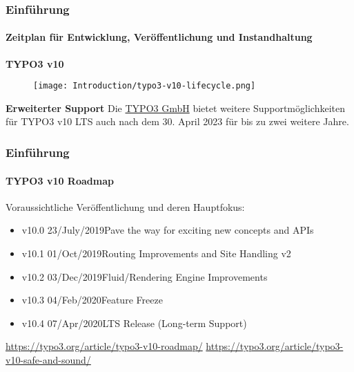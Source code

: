 
\begin{frame}[fragile]
	\frametitle{Einführung}
	\framesubtitle{Zeitplan für Entwicklung, Veröffentlichung und Instandhaltung}

	\textbf{TYPO3 v10}

	\begin{figure}
		\texttt{[image: Introduction/typo3-v10-lifecycle.png]}
	\end{figure}

	\textbf{Erweiterter Support}\newline
	\smaller
		Die \href{https://typo3.com}{TYPO3 GmbH} bietet weitere Supportmöglichkeiten
		für TYPO3 v10 LTS auch nach dem 30. April 2023 für bis zu zwei weitere Jahre.
	\normalsize

\end{frame}


\begin{frame}[fragile]
	\frametitle{Einführung}
	\framesubtitle{TYPO3 v10 Roadmap}

	Voraussichtliche Veröffentlichung und deren Hauptfokus:

	\begin{itemize}

		\item v10.0 \tabto{1.1cm}23/July/2019\tabto{3.4cm}Pave the way for exciting new concepts and APIs
		\item v10.1 \tabto{1.1cm}01/Oct/2019\tabto{3.4cm}Routing Improvements and Site Handling v2
		\item
			\begingroup
				\color{typo3orange}
				v10.2 \tabto{1.1cm}03/Dec/2019\tabto{3.4cm}Fluid/Rendering Engine Improvements
			\endgroup
		\item v10.3 \tabto{1.1cm}04/Feb/2020\tabto{3.4cm}Feature Freeze
		\item v10.4 \tabto{1.1cm}07/Apr/2020\tabto{3.4cm}LTS Release (Long-term Support)

	\end{itemize}

	\smaller
		\url{https://typo3.org/article/typo3-v10-roadmap/}\newline
		\url{https://typo3.org/article/typo3-v10-safe-and-sound/}
	\normalsize

\end{frame}

